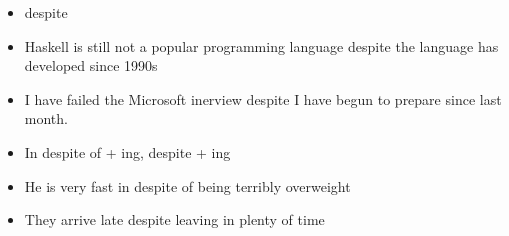 \documentclass{article}
\begin{document}
\begin{itemize}
\item despite 
\item[] Haskell is still not a popular programming language despite the language has developed since 1990s
\item I have failed the Microsoft inerview despite I have begun to prepare since last month. 
\item In despite of + ing,  despite + ing
\item[] He is very fast in despite of being terribly overweight 
\item[] They arrive late despite leaving in plenty of time  
\end{itemize}
\end{document}
